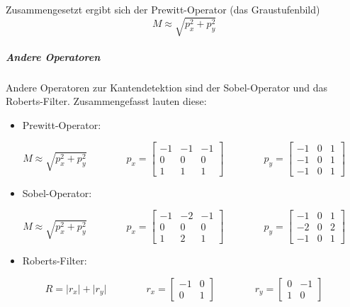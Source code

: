 						Zusammengesetzt ergibt sich der Prewitt-Operator (\bzw das Graustufenbild)
						\begin{equation*}
							M \approx \sqrt{p_x^2 + p_y^2}
						\end{equation*}

					\subparagraph{Andere Operatoren} %
						Andere Operatoren zur Kantendetektion sind \bspw der Sobel-Operator und das Roberts-Filter. Zusammengefasst lauten diese:
						\begin{itemize}
							\item Prewitt-Operator:
						\end{itemize}
						\begin{equation*}
							M \approx \sqrt{p_x^2 + p_y^2} \quad\quad\quad\quad
							p_x = \begin{bmatrix}
								-1 & -1 & -1 \\
								0  & 0  & 0  \\
								1  & 1  & 1
							\end{bmatrix} \quad\quad\quad\quad
							p_y = \begin{bmatrix}
								-1 & 0 & 1 \\
								-1 & 0 & 1 \\
								-1 & 0 & 1
							\end{bmatrix}
						\end{equation*}
						\begin{itemize}
							\item Sobel-Operator:
						\end{itemize}
						\begin{equation*}
							M \approx \sqrt{p_x^2 + p_y^2} \quad\quad\quad\quad
							p_x = \begin{bmatrix}
								-1 & -2 & -1 \\
								0  & 0  & 0  \\
								1  & 2  & 1
							\end{bmatrix} \quad\quad\quad\quad
							p_y = \begin{bmatrix}
								-1 & 0 & 1 \\
								-2 & 0 & 2 \\
								-1 & 0 & 1
							\end{bmatrix}
						\end{equation*}
						\begin{itemize}
							\item Roberts-Filter:
						\end{itemize}
						\begin{equation*}
							R = \lvert r_x \rvert + \lvert r_y \rvert \quad\quad\quad\quad
							r_x = \begin{bmatrix}
								-1 & 0 \\
								0  & 1
							\end{bmatrix} \quad\quad\quad\quad
							r_y = \begin{bmatrix}
								0 & -1 \\
								1 & 0
							\end{bmatrix}
						\end{equation*}

